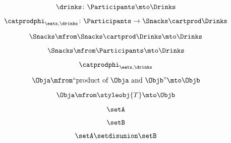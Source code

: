 {\begin{forslides}
        \begin{equation}
            \label{eq:combination-053}
            \drinks\colon \Participants \mto \Drinks
        \end{equation}

        \begin{equation}
            \label{eq:combination-054}
            \catprodphi_{\eats,\drinks} \colon \Participants \to \Snacks \cartprod \Drinks
        \end{equation}

        \begin{equation}
            \label{eq:combination-055}
            \Snacks \mfrom \Snacks \cartprod \Drinks \mto \Drinks
        \end{equation}

        \begin{equation}
            \label{eq:combination-056}
            \Snacks \mfrom  \Participants \mto \Drinks
        \end{equation}

        \begin{equation}
            \label{eq:combination-057}
            \catprodphi_{\eats,\drinks}
        \end{equation}

        \begin{equation}
            \label{eq:combination-058}
            \Obja \mfrom \text{``product of } \Obja \text{ and } \Objb \text{''}  \mto \Objb
        \end{equation}

        \begin{equation}
            \label{eq:combination-059}
            \Obja \mfrom \styleobj{T} \mto \Objb
        \end{equation}

        \begin{equation}
            \label{eq:combination-060}
            \setA
        \end{equation}

        \begin{equation}
            \label{eq:combination-061}
            \setB
        \end{equation}

        \begin{equation}
            \label{eq:combination-062}
            \setA \setdisunion \setB
        \end{equation}


\end{forslides}}
